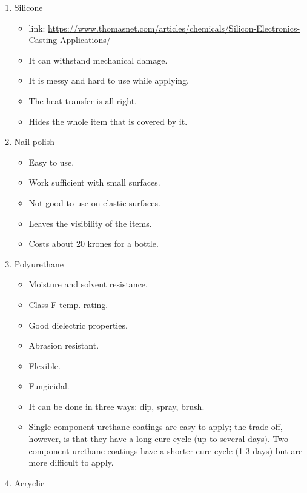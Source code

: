 \begin{enumerate}
\begin{itemize}
          \end{itemize}
    \item Silicone
          \begin{itemize}
              \item link: \url{https://www.thomasnet.com/articles/chemicals/Silicon-Electronics-Casting-Applications/}
              \item It can withstand mechanical damage.
              \item It is messy and hard to use while applying.
              \item The heat transfer is all right.
              \item Hides the whole item that is covered by it.
          \end{itemize}
    \item Nail polish
          \begin{itemize}
              \item Easy to use.
              \item Work sufficient with small surfaces.
              \item Not good to use on elastic surfaces.
              \item Leaves the visibility of the items.
              \item Costs about 20 krones for a bottle.
          \end{itemize}
    \item Polyurethane
          \begin{itemize}
              \item Moisture and solvent resistance.
              \item Class F temp. rating.
              \item Good dielectric properties.
              \item Abrasion resistant.
              \item Flexible.
              \item Fungicidal.
              \item It can be done in three ways: dip, spray, brush.
              \item Single-component urethane coatings are easy to apply; the trade-off, however, is that they have a long cure cycle $($up to several days$)$. Two-component urethane coatings have a shorter cure cycle $($1-3 days$)$ but are more difficult to apply.
          \end{itemize}
    \item Acryclic

\end{enumerate}
